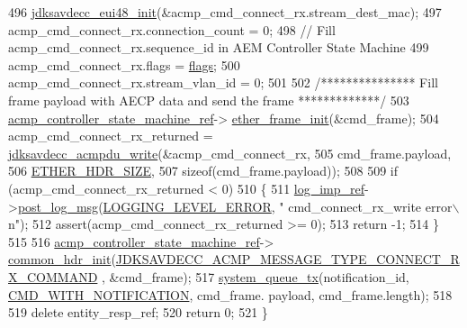 \begin{DoxyCode}
496     \hyperlink{group__eui48_gae0bd9d7b819e8314b425d7c8bbae2333}{jdksavdecc\_eui48\_init}(&acmp\_cmd\_connect\_rx.stream\_dest\_mac);
497     acmp\_cmd\_connect\_rx.connection\_count = 0;
498     \textcolor{comment}{// Fill acmp\_cmd\_connect\_rx.sequence\_id in AEM Controller State Machine}
499     acmp\_cmd\_connect\_rx.flags = \hyperlink{namespaceavdecc__lib_ab6b306ef981f5e21bb41ea2c2dbe8cd9}{flags};
500     acmp\_cmd\_connect\_rx.stream\_vlan\_id = 0;
501 
502     \textcolor{comment}{/*************** Fill frame payload with AECP data and send the frame *************/}
503     \hyperlink{namespaceavdecc__lib_a693c2049de1d4ec860a92126b846ac21}{acmp\_controller\_state\_machine\_ref}->
      \hyperlink{classavdecc__lib_1_1acmp__controller__state__machine_a0a43868a3e99a6cef740e4562d006345}{ether\_frame\_init}(&cmd\_frame);
504     acmp\_cmd\_connect\_rx\_returned = \hyperlink{group__acmpdu_ga8cf8b61ba149419878384da1540d9673}{jdksavdecc\_acmpdu\_write}(&acmp\_cmd\_connect\_rx,
505                                                            cmd\_frame.payload,
506                                                            \hyperlink{namespaceavdecc__lib_a6c827b1a0d973e18119c5e3da518e65ca9512ad9b34302ba7048d88197e0a2dc0}{ETHER\_HDR\_SIZE},
507                                                            \textcolor{keyword}{sizeof}(cmd\_frame.payload));
508 
509     \textcolor{keywordflow}{if} (acmp\_cmd\_connect\_rx\_returned < 0)
510     \{
511         \hyperlink{namespaceavdecc__lib_acbe3e2a96ae6524943ca532c87a28529}{log\_imp\_ref}->\hyperlink{classavdecc__lib_1_1log_a68139a6297697e4ccebf36ccfd02e44a}{post\_log\_msg}(\hyperlink{namespaceavdecc__lib_a501055c431e6872ef46f252ad13f85cdaf2c4481208273451a6f5c7bb9770ec8a}{LOGGING\_LEVEL\_ERROR}, \textcolor{stringliteral}{"
      cmd\_connect\_rx\_write error\(\backslash\)n"});
512         assert(acmp\_cmd\_connect\_rx\_returned >= 0);
513         \textcolor{keywordflow}{return} -1;
514     \}
515 
516     \hyperlink{namespaceavdecc__lib_a693c2049de1d4ec860a92126b846ac21}{acmp\_controller\_state\_machine\_ref}->
      \hyperlink{classavdecc__lib_1_1acmp__controller__state__machine_ae93a117baf9620a7311f950271610506}{common\_hdr\_init}(\hyperlink{group__acmp__message__type_gaf72da38ed84005b55360db3bea1a2e5e}{JDKSAVDECC\_ACMP\_MESSAGE\_TYPE\_CONNECT\_RX\_COMMAND}
      , &cmd\_frame);
517     \hyperlink{namespaceavdecc__lib_a6dd511685627c0865a3442b539a4e8e9}{system\_queue\_tx}(notification\_id, \hyperlink{namespaceavdecc__lib_aabcadff06aa62be0ce47bc0646823604aba48b8a017e06fb240b650cdea965178}{CMD\_WITH\_NOTIFICATION}, cmd\_frame.
      payload, cmd\_frame.length);
518 
519     \textcolor{keyword}{delete} entity\_resp\_ref;
520     \textcolor{keywordflow}{return} 0;
521 \}
\end{DoxyCode}



